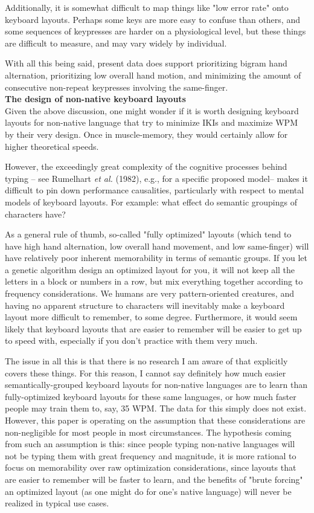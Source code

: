 \documentclass[11pt]{article}
\begin{document}
Additionally, it is somewhat difficult to map things like "low error rate" onto keyboard layouts. Perhaps some keys are more easy to confuse than others, and some sequences of keypresses are harder on a physiological level, but these things are difficult to measure, and may vary widely by individual.

With all this being said, present data does support prioritizing bigram hand alternation, prioritizing low overall hand motion, and minimizing the amount of consecutive non-repeat keypresses involving the same-finger. \\

\noindent \textbf{The design of non-native keyboard layouts} \\

Given the above discussion, one might wonder if it is worth designing keyboard layouts for non-native language that try to minimize IKIs and maximize WPM by their very design. Once in muscle-memory, they would certainly allow for higher theoretical speeds.

However, the exceedingly great complexity of the cognitive processes behind typing -- see Rumelhart \emph{et al.} (1982), e.g., for a specific proposed model-- makes it difficult to pin down performance causalities, particularly with respect to mental models of keyboard layouts. For example: what effect do semantic groupings of characters have?

As a general rule of thumb, so-called "fully optimized" layouts (which tend to have high hand alternation, low overall hand movement, and low same-finger) will have relatively poor inherent memorability in terms of semantic groups. If you let a genetic algorithm design an optimized layout for you, it will not keep all the letters in a block or numbers in a row, but mix everything together according to frequency considerations. We humans are very pattern-oriented creatures, and having no apparent structure to characters will inevitably make a keyboard layout more difficult to remember, to some degree. Furthermore, it would seem likely that keyboard layouts that are easier to remember will be easier to get up to speed with, especially if you don't practice with them very much.

The issue in all this is that there is no research I am aware of that explicitly covers these things. For this reason, I cannot say definitely how much easier semantically-grouped keyboard layouts for non-native languages are to learn than fully-optimized keyboard layouts for these same languages, or how much faster people may train them to, say, 35 WPM. The data for this simply does not exist. However, this paper is operating on the assumption that these considerations are non-negligible for most people in most circumstances. The hypothesis coming from such an assumption is this: since people typing non-native languages will not be typing them with great frequency and magnitude, it is more rational to focus on memorability over raw optimization considerations, since layouts that are easier to remember will be faster to learn, and the benefits of "brute forcing" an optimized layout (as one might do for one's native language) will never be realized in typical use cases. \\
\end{document}
